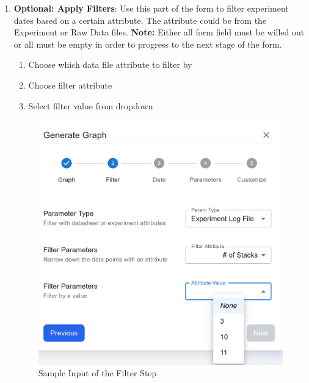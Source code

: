 \documentclass[12pt]{article}
\begin{document}
\begin{enumerate}
    \item \textbf{Optional: Apply Filters}: \newline
    Use this part of the form to filter experiment dates based on a certain
    attribute. The attribute could be from the Experiment or Raw Data files.
    \newline
    \textbf{Note:} Either all form field must be willed out or all must be empty in order
    to progress to the next stage of the form. 
    \begin{enumerate}
        \item Choose which data file attribute to filter by
        \item Choose filter attribute 
        \item Select filter value from dropdown
    \end{enumerate}
    \begin{figure}[H]
        \centering
        \includegraphics[scale=0.4]{./Diagrams/graph-filter.png}
        \caption{Sample Input of the Filter Step}
        \label{fig:example}
    \end{figure}


\end{enumerate}
\end{document}
